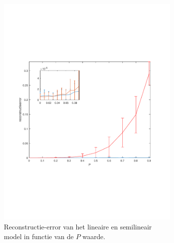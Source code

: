 \documentclass[12pt]{report}
\begin{document}
\begin{figure}
\begin{subfigure}[b]{0.5\textwidth}
\includegraphics[width=\textwidth,trim=0 200 0 175 cm]{PMC_AAM_10_100_El.pdf}
\caption{Reconstructie-error van het lineaire en semilineair model in functie van de $P$ waarde. \label{fig:AEl}}
\end{subfigure}
\begin{subfigure}[b]{0.5\textwidth}

\end{subfigure}
\end{figure}
\end{document}

